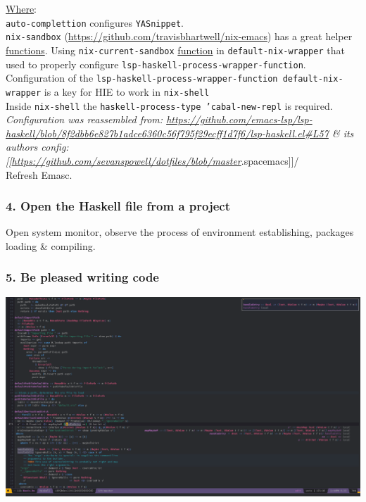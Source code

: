\documentclass[11pt]{article}
\begin{document}
\hyperref[orgefd1ecd]{Where}:\\

\texttt{auto-complettion} configures \texttt{YASnippet}.\\

\texttt{nix-sandbox} (\url{https://github.com/travisbhartwell/nix-emacs}) has a great helper \hyperref[org66c5288]{functions}. Using \texttt{nix-current-sandbox} \hyperref[orgeb5cddb]{function} in \texttt{default-nix-wrapper} that used to properly configure \texttt{lsp-haskell-process-wrapper-function}.\\

Configuration of the \texttt{lsp-haskell-process-wrapper-function default-nix-wrapper} is a key for HIE to work in \texttt{nix-shell}\\

Inside \texttt{nix-shell} the \texttt{haskell-process-type 'cabal-new-repl} is required.\\

\emph{Configuration was reassembled from: \url{https://github.com/emacs-lsp/lsp-haskell/blob/8f2dbb6e827b1adce6360c56f795f29ecff1d7f6/lsp-haskell.el\#L57} \& its authors config: [[\url{https://github.com/sevanspowell/dotfiles/blob/master}}.spacemacs]]/\\

Refresh Emasc.\\

\subsubsection{4. Open the Haskell file from a project}
\label{sec:orge375d70}

Open system monitor, observe the process of environment establishing, packages loading \& compiling.\\

\subsubsection{5. Be pleased writing code}
\label{sec:org554ae4d}

\begin{center}
\includegraphics[width=.9\linewidth]{images/Screenshot_20190727_134446.png}
\end{center}
\end{document}
